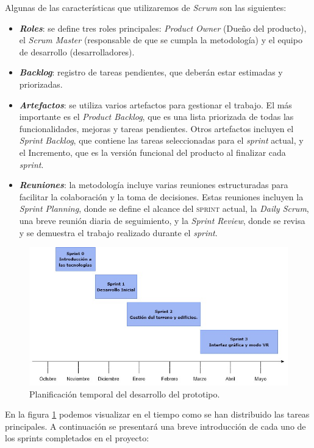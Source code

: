 \documentclass[a4paper, 11pt]{book}
\begin{document}
\noindent Algunas de las características que utilizaremos de \emph{Scrum} son las siguientes:
\begin{itemize}
\item \textbf{\emph{Roles}}: se define tres roles principales: \emph{Product Owner} (Dueño del producto), el \emph{Scrum Master} (responsable de que se cumpla la metodología) y el equipo de desarrollo (desarrolladores).
\item \textbf{\emph{Backlog}}: registro de tareas pendientes, que deberán estar estimadas y priorizadas.
\item \textbf{\emph{Artefactos}}: se utiliza varios artefactos para gestionar el trabajo. El más importante es el \emph{Product Backlog}, que es una lista priorizada de todas las funcionalidades, mejoras y tareas pendientes. Otros artefactos incluyen el \emph{Sprint} \emph{Backlog}, que contiene las tareas seleccionadas para el \emph{sprint} actual, y el Incremento, que es la versión funcional del producto al finalizar cada \emph{sprint}.
\item \textbf{\emph{Reuniones}}: la metodología incluye varias reuniones estructuradas para facilitar la colaboración y la toma de decisiones. Estas reuniones incluyen la \emph{Sprint Planning}, donde se define el alcance del \textsc{sprint} actual, la \emph{Daily Scrum}, una breve reunión diaria de seguimiento, y la \emph{Sprint Review}, donde se revisa y se demuestra el trabajo realizado durante el \emph{sprint}.
\end{itemize}

\begin{figure}[h]
  \centering
  \includegraphics[width=12cm, keepaspectratio]{img/scrum.jpg}
  \caption{Planificación temporal del desarrollo del prototipo.}
  \label{fig:scrum}
\end{figure}

En la figura \ref{fig:scrum} podemos visualizar en el tiempo como se han distribuido las tareas principales. A continuación se presentará una breve introducción de cada uno de los sprints completados en el proyecto:
\end{document}
